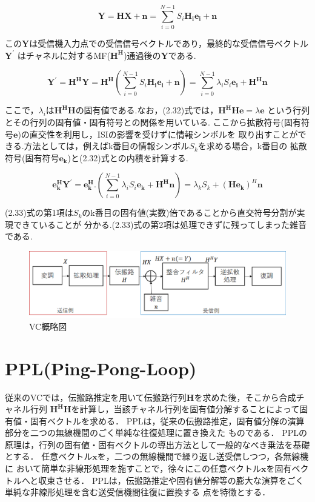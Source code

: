 \begin{equation}
    \bm{Y} = \bm{HX}+\bm{n} = \sum_{i=0}^{N-1} S_i\bm{H_ie_i}+\bm{n}
\end{equation}

この$\bm{Y}$は受信機入力点での受信信号ベクトルであり，最終的な受信信号ベクトル$\bm{Y^{\prime}}$
はチャネルに対するMF($\bm{H^H}$)通過後の$\bm{Y}$である.

\begin{equation}
    \bm{Y^{\prime}}=\bm{H^HY}=\bm{H^H}
    \left(
        \sum_{i=0}^{N-1} S_i\bm{H_ie_i}+\bm{n}
    \right)
    =\sum_{i=0}^{N-1} \lambda_iS_i\bm{e_i}+\bm{H^Hn}
\end{equation}

ここで，$\lambda_i$は$\bm{H^HH}$の固有値である.なお，(2.32)式では，$\bm{H^HHe}=\lambda\bm{e}$
という行列とその行列の固有値・固有符号との関係を用いている.
ここから拡散符号(固有符号$\bm{e}$)の直交性を利用し，ISIの影響を受けずに情報シンボルを
取り出すことができる.方法としては，例えばk番目の情報シンボル$S_k$を求める場合，k番目の
拡散符号(固有符号$\bm{e_k}$)と(2.32)式との内積を計算する.

\begin{equation}
    \bm{e_k^HY^{\prime}}=\bm{e_k^H}.
    \left(
        \sum_{i=0}^{N-1} \lambda_iS_i\bm{e_k}+\bm{H^Hn}
    \right)
    =\lambda_kS_k+(\bm{He_k})^H\bm{n}
\end{equation}

(2.33)式の第1項は$S_k$のk番目の固有値(実数)倍であることから直交符号分割が実現できていることが
分かる.(2.33)式の第2項は処理できずに残ってしまった雑音である.

\begin{figure}
    \centering
    \includegraphics[width=\linewidth]{chapter3/figure/VC.eps}
    \caption{VC概略図}
    \label{figVC}
\end{figure}

\section{PPL(Ping-Pong-Loop)}
従来のVCでは，伝搬路推定を用いて伝搬路行列$\bm{H}$を求めた後，そこから合成チャネル行列
$\bm{H^HH}$を計算し，当該チャネル行列を固有値分解することによって固有値・固有ベクトルを求める．
PPLは，従来の伝搬路推定，固有値分解の演算部分を二つの無線機間のごく単純な往復処理に置き換えた
ものである．
PPLの原理は，行列の固有値・固有ベクトルの導出方法として一般的なべき乗法を基礎とする．
任意ベクトル$\bm{x}$を，二つの無線機間で繰り返し送受信しつつ，各無線機に
おいて簡単な非線形処理を施すことで，徐々にこの任意ベクトル$\bm{x}$を固有ベクトルへと収束させる．
PPLは，伝搬路推定や固有値分解等の膨大な演算をごく単純な非線形処理を含む送受信機間往復に置換する
点を特徴とする．

